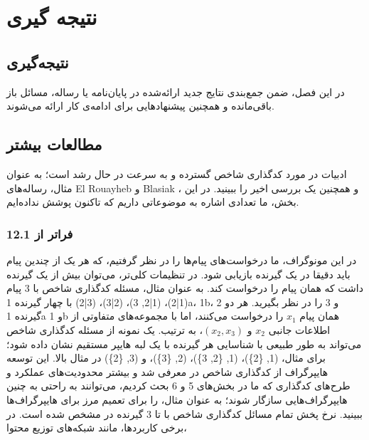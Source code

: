 \chapter{نتیجه گیری}
\section{نتیجه‌گیری}

در این فصل، ضمن جمع‌بندی نتایج جدید ارائه‌شده در پایان‌نامه یا رساله،
مسائل باز باقی‌مانده و همچنین پیشنهادهایی برای ادامه‌ی کار ارائه می‌شوند.
\section{مطالعات بیشتر}

ادبیات در مورد کدگذاری شاخص گسترده و به سرعت در حال رشد است؛ به عنوان مثال، رساله‌های El Rouayheb \lr{[63]} و Blasiak \lr{[30]}، و همچنین یک بررسی اخیر \lr{[33]} را ببینید. در این بخش، ما تعدادی اشاره به موضوعاتی داریم که تاکنون پوشش نداده‌ایم.

\subsection{12.1 فراتر از }
در این مونوگراف، ما درخواست‌های  پیام‌ها را در نظر گرفتیم، که هر یک از چندین پیام باید دقیقا در یک گیرنده بازیابی شود. در تنظیمات  کلی‌تر، می‌توان بیش از یک گیرنده داشت که همان پیام را درخواست کند. به عنوان مثال، مسئله کدگذاری شاخص  با 3 پیام (1|2)، (1|2, 3)، (2|3)، (3|2) با چهار گیرنده 1a، 1b، 2 و 3 را در نظر بگیرید. هر دو گیرنده 1a و 1b همان پیام \(x_1\) را درخواست می‌کنند، اما با مجموعه‌های متفاوتی از اطلاعات جانبی \(x_2\) و \((x_2, x_3)\)، به ترتیب.
یک نمونه از مسئله کدگذاری شاخص  می‌تواند به طور طبیعی با شناسایی هر گیرنده با یک لبه هایپر مستقیم نشان داده شود؛ برای مثال، (1, \{2\})، (1, \{2, 3\})، (2, \{3\})، و (3, \{2\}) در مثال بالا. این توسعه هایپرگراف از کدگذاری شاخص در \lr{[3]} معرفی شد و بیشتر محدودیت‌های عملکرد و طرح‌های کدگذاری که ما در بخش‌های 5 و 6 بحث کردیم، می‌توانند به راحتی به چنین هایپرگراف‌هایی سازگار شوند؛ به عنوان مثال، \lr{[28]} را برای تعمیم مرز  برای هایپرگراف‌ها ببینید. نرخ پخش تمام مسائل کدگذاری شاخص  با تا 3 گیرنده در \lr{[149]} مشخص شده است.
در برخی کاربردها، مانند شبکه‌های توزیع محتوا،

